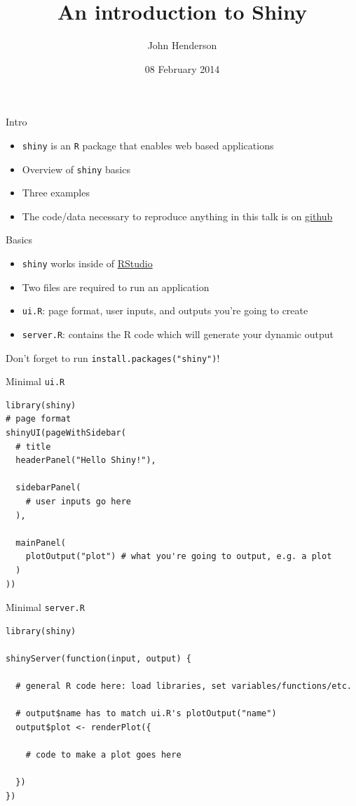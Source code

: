 \documentclass[sans,aspectratio=169,presentation,bigger,fleqn]{beamer}
\author{John Henderson}
\date{08 February 2014}
\title{An introduction to Shiny}
\begin{document}
\maketitle

\begin{frame}[fragile,label=sec-1]{Intro}
 \begin{itemize}
\item \texttt{shiny} is an \texttt{R} package that enables web based applications
\item Overview of \texttt{shiny} basics
\item Three examples
\item The code/data necessary to reproduce anything in this talk is on \href{https://github.com/jwhendy/devFest-shiny}{github}
\end{itemize}
\end{frame}
\begin{frame}[fragile,label=sec-2]{Basics}
 \begin{itemize}
\item \texttt{shiny} works inside of \href{http://www.rstudio.com/}{RStudio}

\item Two files are required to run an application
\item \texttt{ui.R}: page format, user inputs, and outputs you're going to create
\item \texttt{server.R}: contains the R code which will generate your dynamic output
\end{itemize}

\vspace{0.5cm}

Don't forget to run \texttt{install.packages("shiny")}!
\end{frame}
\begin{frame}[fragile,label=sec-3]{Minimal \texttt{ui.R}}
 \scriptsize
\begin{verbatim}
library(shiny)
# page format
shinyUI(pageWithSidebar(
  # title
  headerPanel("Hello Shiny!"),

  sidebarPanel(
    # user inputs go here
  ),

  mainPanel(
    plotOutput("plot") # what you're going to output, e.g. a plot
  )
))
\end{verbatim}
\scriptsize
\end{frame}
\begin{frame}[fragile,label=sec-4]{Minimal \texttt{server.R}}
 \scriptsize
\begin{verbatim}
library(shiny)

shinyServer(function(input, output) {

  # general R code here: load libraries, set variables/functions/etc.

  # output$name has to match ui.R's plotOutput("name")
  output$plot <- renderPlot({

    # code to make a plot goes here

  })
})
\end{verbatim}
\scriptsize
\end{frame}
\end{document}
